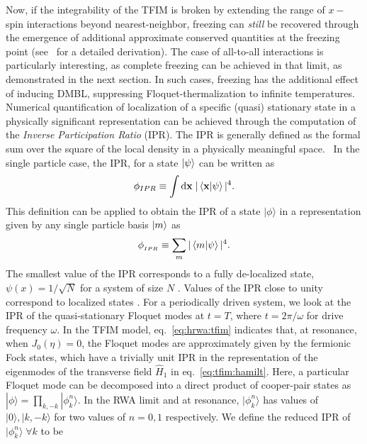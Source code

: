 \documentclass[%
reprint,
superscriptaddress,
amsmath,amssymb,
aps,
prb,
showkeys,
]{revtex4-2}
\begin{document}
Now, if the integrability of the TFIM is broken by extending the range of $x-$spin interactions beyond nearest-neighbor, freezing can \textit{still} be recovered through the emergence of additional approximate conserved quantities at the freezing point (see~\cite{rahaman2024time} for a detailed derivation). The case of all-to-all interactions is particularly interesting, as complete freezing can be achieved in that limit, as demonstrated in the next section. In such cases, freezing has the additional effect of inducing DMBL, suppressing Floquet-thermalization to infinite temperatures. Numerical quantification of localization of a specific (quasi) stationary state in a physically significant representation can be achieved through the computation of the \emph{Inverse Participation Ratio} (IPR).  {The IPR is generally defined as the formal sum over the square of the local density in a physically meaningful space.}~\cite{mukherjee_modulation-assisted_2015,lin_many-body_2018,murphy_generalized_2011, torres-herrera_self-averaging_2020} {In the single particle case,  the IPR, } for a state $\ket{\psi}$ can be written as
\begin{equation*}
	\phi_{IPR}\equiv \int \mathrm{d}\mathbf{x}\;\vert\ip{\mathbf{x}}{\psi}\vert^4.
\end{equation*}
This definition can be {applied} to {obtain} the IPR of a state $|\phi\rangle$ in a representation given by {any single particle} basis $\ket{m}$ as 
\begin{equation}
	\label{eq:ipr:defn}
	\phi_{{_{IPR}}} \equiv \sum_m\vert\ip{m}{\psi}\vert^4.
\end{equation}
The smallest value of the IPR corresponds to a fully de-localized state, $\psi(x)=1/\sqrt{N}$ for a system of size $N$ \cite{torres-herrera_self-averaging_2020,trivedi_can_2005}. Values of the IPR close to unity correspond to localized states \cite{Misguich2016}. For a periodically driven system, we look at the IPR of the quasi-stationary Floquet modes at $t=T$, where $t=2\pi/\omega$ for drive frequency $\omega$. In the TFIM model, eq.~\ref{eq:hrwa:tfim} indicates that, at resonance, when $J_0(\eta)=0$, the Floquet modes are approximately given by the fermionic Fock states, which have a trivially unit IPR in the representation of the eigenmodes of the transverse field $\hat{H}_1$ in eq.~\ref{eq:tfim:hamilt}. Here, a particular Floquet mode can be decomposed into a direct product of cooper-pair states as $|\phi\rangle = \prod_{k,-k}|\phi^n_k\rangle$. In the RWA limit and at resonance, $|\phi^n_k\rangle$ has values of $|0\rangle, |k,-k\rangle$ for two values of $n=0,1$ respectively. We define the reduced IPR of $|\phi^n_k\rangle\; \forall k$ to be
\end{document}
